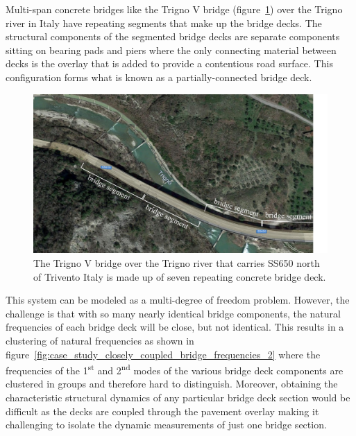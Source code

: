 \documentclass[12pt,letter]{article}
\begin{document}
	\begin{vibration_case_study}
	Multi-span concrete bridges like the Trigno V bridge (figure~\ref{fig:case_study_closely_coupled_bridge_frequencies_1}) over the Trigno river in Italy have repeating segments that make up the bridge decks. The structural components of the segmented bridge decks are separate components sitting on bearing pads and piers where the only connecting material between decks is the overlay that is added to provide a contentious road surface. This configuration forms what is known as a partially-connected bridge deck\protect\footnotemark[1].
	\begin{figure}[H]
		\centering
		\includegraphics[width=\linewidth]{../figures/case_study_closely_coupled_bridge_frequencies_1}
		\caption{The Trigno V bridge over the Trigno river that carries SS650 north of Trivento Italy is made up of seven repeating concrete bridge deck\protect\footnotemark[2]. }%
		\label{fig:case_study_closely_coupled_bridge_frequencies_1}
	\end{figure}
	
	This system can be modeled as a multi-degree of freedom problem. However, the challenge is that with so many nearly identical bridge components, the natural frequencies of each bridge deck will be close, but not identical. This results in a clustering of natural frequencies as shown in figure~\ref{fig:case_study_closely_coupled_bridge_frequencies_2} where the frequencies of the 1\textsuperscript{st} and 2\textsuperscript{nd} modes of the various bridge deck components are clustered in groups and therefore hard to distinguish. Moreover, obtaining the characteristic structural dynamics of any particular bridge deck section would be difficult as the decks are coupled through the pavement overlay making it challenging to isolate the dynamic measurements of just one bridge section. 
	

\end{vibration_case_study}
\end{document}
